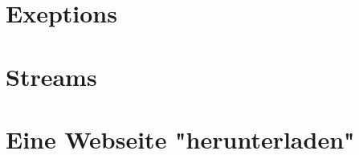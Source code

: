 \documentclass{beamer}
\begin{document}
\section{Exeptions}
\section{Streams}
\section{Eine Webseite "herunterladen"}
\end{document}
